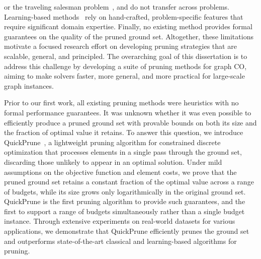 or the traveling salesman problem~\citep{fitzpatrick2021learning, sun2021generalization},
and do not transfer across problems. Learning-based
methods~\citep{manchanda2020gcomb, ireland2022lense, tian2024combhelper} rely on
hand-crafted, problem-specific features that require significant domain expertise.
Finally, no existing method provides formal guarantees on the quality of the pruned
ground set.
Altogether, these limitations motivate a focused research effort on developing pruning
strategies that are scalable, general, and principled. The overarching goal of this
dissertation is to address this challenge by developing a suite of pruning methods for
graph CO, aiming to make solvers faster, more general, and
more practical for large-scale graph instances.

Prior to our first work, all existing pruning methods were heuristics with no formal
performance guarantees. It was unknown whether it was even possible to efficiently produce
a pruned ground set with provable bounds on both its size and the fraction of optimal
value it retains. To answer this question, we introduce
QuickPrune~\citep{pmlr-v258-nath25a}, a lightweight pruning algorithm for constrained
discrete optimization that processes elements in a single pass through the ground set,
discarding those unlikely to appear in an optimal solution. Under mild assumptions on
the objective function and element costs, we prove that the pruned ground set retains a
constant fraction of the optimal value across a range of budgets, while its size grows
only logarithmically in the original ground set. QuickPrune is the first pruning
algorithm to provide such guarantees, and the first to support a range of budgets
simultaneously rather than a single budget instance. Through extensive experiments on
real-world datasets for various applications, we demonstrate that QuickPrune efficiently
prunes the ground set and outperforms state-of-the-art classical and learning-based
algorithms for pruning.


